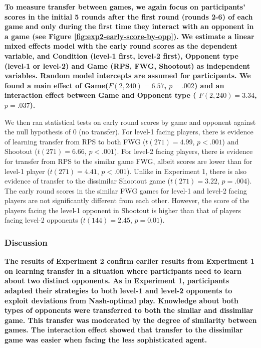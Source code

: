 \documentclass[english,man,floatsintext]{apa6}
\begin{document}
\textbf{To measure transfer between games, we again focus on participants' scores in the initial 5 rounds after the first round (rounds 2-6) of each game and only during the first time they interact with an opponent in a game (see Figure \ref{fig:exp2-early-score-by-opp}). We estimate a linear mixed effects model with the early round scores as the dependent variable, and Condition (level-1 first, level-2 first), Opponent type (level-1 or level-2) and Game (RPS, FWG, Shootout) as independent variables. Random model intercepts are assumed for participants. We found a main effect of Game(\(F(2,240) = 6.57\), \(p = .002\)) and an interaction effect between Game and Opponent type ( \(F(2,240) = 3.34\), \(p = .037\)).}

We then ran statistical tests on early round scores by game and opponent against the null hypothesis of 0 (no transfer). For level-1 facing players, there is evidence of learning transfer from RPS to both FWG (\(t(271) = 4.99\), \(p < .001\)) and Shootout (\(t(271) = 6.66\), \(p < .001\)). For level-2 facing players, there is evidence for transfer from RPS to the similar game FWG, albeit scores are lower than for level-1 player (\(t(271) = 4.41\), \(p < .001\)). Unlike in Experiment 1, there is also evidence of transfer to the dissimilar Shootout game (\(t(271) = 3.22\), \(p = .004\)). The early round scores in the similar FWG games for level-1 and level-2 facing players are not significantly different from each other. However, the score of the players facing the level-1 opponent in Shootout is higher than that of players facing level-2 opponents (\(t(144) = 2.45\), \(p = 0.01\)).

\hypertarget{discussion-1}{%
\subsubsection{Discussion}\label{discussion-1}}

\textbf{The results of Experiment 2 confirm earlier results from Experiment 1 on learning transfer in a situation where participants need to learn about two distinct opponents. As in Experiment 1, participants adapted their strategies to both level-1 and level-2 opponents to exploit deviations from Nash-optimal play. Knowledge about both types of opponents were transferred to both the similar and dissimilar game. This transfer was moderated by the degree of similarity between games. The interaction effect showed that transfer to the dissimilar game was easier when facing the less sophisticated agent.}
\end{document}
